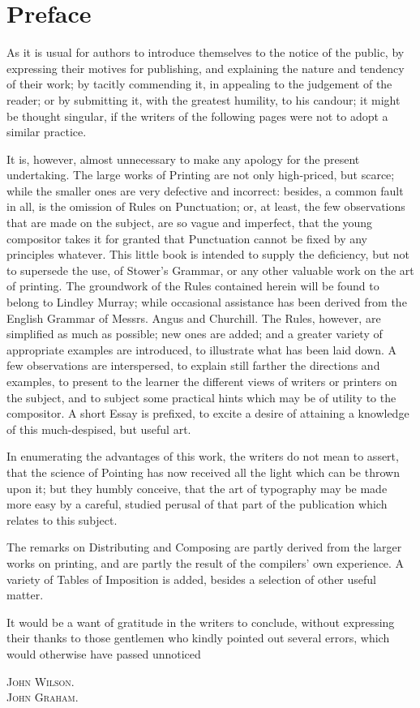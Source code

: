 \chapter{Preface}
As it is usual for authors to introduce themselves to the notice of the public,
by expressing their motives for publishing, and explaining the nature and
tendency of their work; by tacitly commending it, in appealing to the judgement
of the reader; or by submitting it, with the greatest humility, to his candour;
it might be thought singular, if the writers of the following pages were not to
adopt a similar practice.

It is, however, almost unnecessary to make any apology for the present
undertaking. The large works of Printing are not only high-priced, but scarce;
while the smaller ones are very defective and incorrect: besides, a common fault
in all, is the omission of Rules on Punctuation; or, at least, the few
observations that are made on the subject, are so vague and imperfect, that the
young compositor takes it for granted that Punctuation cannot be fixed by any
principles whatever. This little book is intended to supply the deficiency, but
not to supersede the use, of Stower's Grammar, or any other valuable work on the
art of printing. The groundwork of the Rules contained herein will be found to
belong to Lindley Murray; while occasional assistance has been derived from the
English Grammar of Messrs. Angus and Churchill. The Rules, however, are
simplified as much as possible; new ones are added; and a greater variety of
appropriate examples are introduced, to illustrate what has been laid down.
A few observations are interspersed, to explain still farther the directions and
examples, to present to the learner the different views of writers or printers
on the subject, and to subject some practical hints which may be of utility to
the compositor. A short Essay is prefixed, to excite a desire of attaining a
knowledge of this much-despised, but useful art.

In enumerating  the advantages of this work, the writers do not mean to assert,
that the science of Pointing has now received all the light which can be thrown
upon it; but they humbly conceive, that the art of typography may be made more
easy by a careful, studied perusal of that part of the publication which relates
to this subject.

The remarks on Distributing and Composing are partly derived from the larger
works on printing, and are partly the result of the compilers' own experience.
A variety of Tables of Imposition is added, besides a selection of other useful
matter.

It would be a want of gratitude in the writers to conclude, without expressing
their thanks to those gentlemen who kindly pointed out several errors, which would
otherwise have passed unnoticed
\begin{flushright}
    \scshape
    John Wilson.\\
    John Graham.
    \rmfamily
\end{flushright}
